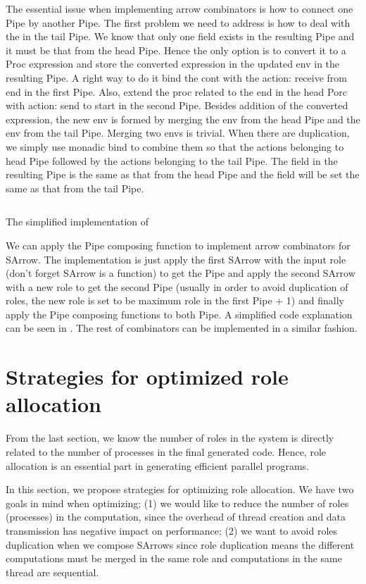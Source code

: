 The essential issue when implementing arrow combinators is how to connect one Pipe by another Pipe. The first problem we need to address is how to deal with the  in the tail Pipe. We know that only one  field exists in the resulting Pipe and it must be that from the head Pipe. Hence the only option is to convert it to a Proc expression and store the converted expression in the updated env in the resulting Pipe. A right way to do it bind the cont with the action: receive from end in the first Pipe. Also, extend the proc related to the end in the head Porc with action: send to start in the second Pipe. Besides addition of the converted  expression, the new env is formed by merging the env from the head Pipe and the env from the tail Pipe. Merging two envs is trivial. When there are duplication, we simply use monadic bind to combine them so that the actions belonging to head Pipe followed by the actions belonging to the tail Pipe. The  field in the resulting Pipe is the same as that from the head Pipe and the  field will be set the same as that from the tail Pipe.
\begin{listing}
\inputminted{Haskell}{arrow/impl.hs}
\caption{The simplified implementation of \hask{>>>}}
\label{SArrow:code:impl}
\end{listing}
We can apply the Pipe composing function to implement arrow combinators for SArrow. The implementation is just apply the first SArrow with the input role (don't forget SArrow is a function) to get the Pipe and apply the second SArrow with a new role to get the second Pipe (usually in order to avoid duplication of roles, the new role is set to be maximum role in the first Pipe + 1) and finally apply the Pipe composing functions to both Pipe. A simplified code explanation can be seen in . The rest of combinators can be implemented in a similar fashion.

\section{Strategies for optimized role allocation} \label{SArrow:roleAllc}
From the last section, we know the number of roles in the system is directly related to the number of processes in the final generated code. Hence, role allocation is an essential part in generating efficient parallel programs. 

In this section, we propose strategies for optimizing role allocation. We have two goals in mind when optimizing; (1) we would like to reduce the number of roles (processes) in the computation, since the overhead of thread creation and data transmission has negative impact on performance; (2) we want to avoid roles duplication when we compose SArrows since role duplication means the different computations must be merged in the same role and computations in the same thread are sequential.

